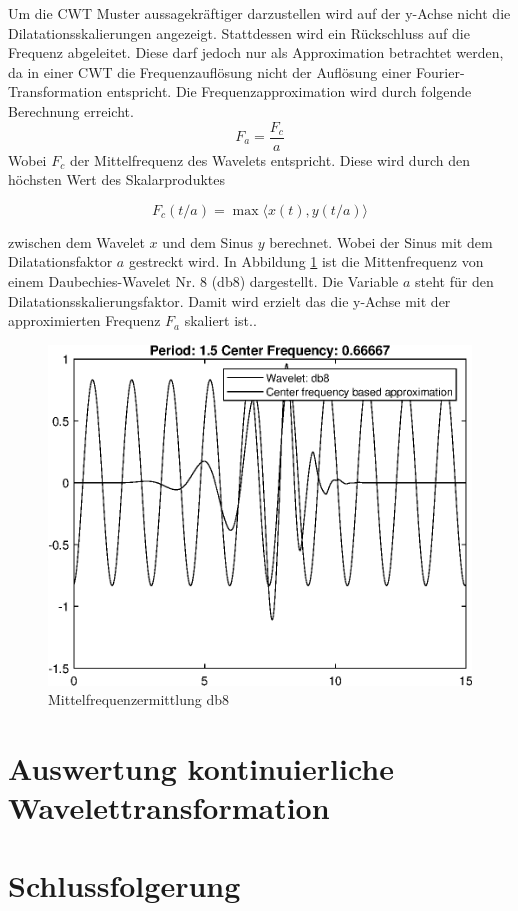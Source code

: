 \begin{refsection}
Um die CWT Muster aussagekräftiger darzustellen wird auf der y-Achse nicht die Dilatationsskalierungen angezeigt. Stattdessen wird ein Rückschluss auf die Frequenz abgeleitet. Diese darf jedoch nur als Approximation betrachtet werden, da in einer CWT die Frequenzauflösung nicht der Auflösung einer Fourier-Transformation entspricht. Die Frequenzapproximation wird durch folgende Berechnung erreicht.
\begin{equation}
F_a=\dfrac{F_c}{a}
\end{equation}
Wobei $F_c$ der Mittelfrequenz des Wavelets entspricht.
Diese wird durch den höchsten Wert des Skalarproduktes 

\begin{equation}
F_c(t/a) = \max\langle x(t),y(t/a)\rangle
\end{equation}

zwischen dem Wavelet $x$ und dem Sinus $y$ berechnet.
Wobei der Sinus mit dem Dilatationsfaktor $a$ gestreckt wird.
In Abbildung \ref{fig:Mittenfrequ} ist die Mittenfrequenz von einem Daubechies-Wavelet Nr. 8 (db8) dargestellt.
Die Variable $a$ steht für den Dilatationsskalierungsfaktor. 
Damit wird erzielt das die y-Achse mit der approximierten Frequenz $F_a$ skaliert ist..

\begin{figure}
	\centering
	\includegraphics [width=0.7\linewidth] {papers/gis/Bilder/epsFig}
	\caption{Mittelfrequenzermittlung db8}
	\label{fig:Mittenfrequ}
\end{figure}


\section{Auswertung kontinuierliche Wavelettransformation}

\section{Schlussfolgerung}
 
\printbibliography[heading=subbibliography]
\end{refsection}
